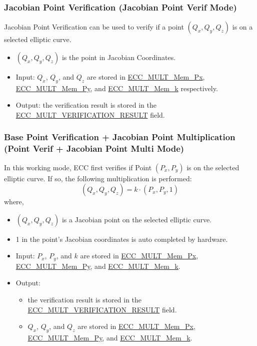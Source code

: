 \documentclass[main\_\_EN.tex]{subfiles}
\begin{document}
\subsubsection{Jacobian Point Verification (Jacobian Point Verif Mode)}

Jacobian Point Verification can be used to verify if a point $(Q_x,Q_y,Q_z)$ is on a selected elliptic curve.
\begin{itemize}
    \item $(Q_x,Q_y,Q_z)$ is the point in Jacobian Coordinates.
    \item Input: $Q_x$, $Q_y$, and $Q_z$ are stored in \hyperref[tab:ecc-memory]{ECC\_MULT\_Mem\_Px}, \hyperref[tab:ecc-memory]{ECC\_MULT\_Mem\_Py}, and \hyperref[tab:ecc-memory]{ECC\_MULT\_Mem\_k}  respectively.
    \item Output: the verification result is stored in the \hyperref[fielddesc:ECCMULTVERIFICATIONRESULT]{ECC\_MULT\_VERIFICATION\_RESULT} field.
\end{itemize}

\subsubsection{Base Point Verification + Jacobian Point Multiplication (Point Verif + Jacobian Point Multi Mode)}

In this working mode, ECC first verifies if Point $(P_x,P_y)$ is on the selected elliptic curve. If so, the following multiplication is performed:
\[
(Q_x,Q_y,Q_z) = k \cdot (P_x,P_y,1)
\]
where,
\begin{itemize}
    \item $(Q_x,Q_y,Q_z)$ is a Jacobian point on the selected elliptic curve.
    \item 1 in the point's Jacobian coordinates is auto completed by hardware.
    \item Input: $P_x$, $P_y$, and $k$ are stored in \hyperref[tab:ecc-memory]{ECC\_MULT\_Mem\_Px}, \hyperref[tab:ecc-memory]{ECC\_MULT\_Mem\_Py}, and \hyperref[tab:ecc-memory]{ECC\_MULT\_Mem\_k}.
    \item Output: 
    \begin{itemize}
        \item the verification result is stored in the \hyperref[fielddesc:ECCMULTVERIFICATIONRESULT]{ECC\_MULT\_VERIFICATION\_RESULT} field.
        \item $Q_x$, $Q_y$, and $Q_z$ are stored in \hyperref[tab:ecc-memory]{ECC\_MULT\_Mem\_Px}, \hyperref[tab:ecc-memory]{ECC\_MULT\_Mem\_Py}, and \hyperref[tab:ecc-memory]{ECC\_MULT\_Mem\_k}.
    \end{itemize}
\end{itemize}
\end{document}
